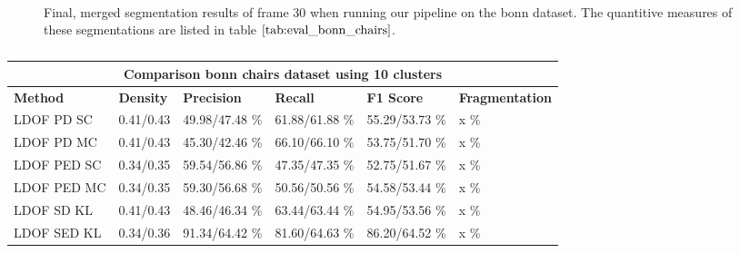\begin{figure}[H]
\begin{center}
~
~
\end{center}
\caption[Merged Segments Bonn Chairs]{Final, merged segmentation results of frame 30 when running our pipeline on the bonn dataset. The quantitive measures of these segmentations are listed in table $\ref{tab:eval_bonn_chairs}$.}
\label{fig:eval_bonn_chairs_c_10}
\end{figure}

\begin{table}[H]
\centering
\begin{tabular}{|l|l|l|l|l|l|}
\hline
\multicolumn{6}{|c|}{Comparison bonn chairs dataset using 10 clusters}                        \\ \hline
\textbf{Method} & \textbf{Density} & \textbf{Precision} & \textbf{Recall} & \textbf{F1 Score} & \textbf{Fragmentation} \\ \hline
LDOF PD SC & 0.41/0.43 & 49.98/47.48 \%   & 61.88/61.88 \%     & 55.29/53.73 \%  & x \% \\ \hline
LDOF PD MC & 0.41/0.43 & 45.30/42.46 \%   & 66.10/66.10 \%     & 53.75/51.70 \%  & x \%   \\ \hline
LDOF PED SC & 0.34/0.35& 59.54/56.86 \%   & 47.35/47.35 \%     & 52.75/51.67 \%  & x \%   \\ \hline
LDOF PED MC & 0.34/0.35 & 59.30/56.68 \%   & 50.56/50.56 \%     & 54.58/53.44 \%  & x \%   \\ \hline              
LDOF SD KL & 0.41/0.43 & 48.46/46.34 \%   & 63.44/63.44 \%     & 54.95/53.56 \%  & x \%   \\ \hline
LDOF SED KL & 0.34/0.36 & 91.34/64.42 \%   & 81.60/64.63 \%     & 86.20/64.52 \%    & x \%  \\ \hline
\end{tabular}
\caption[Bonn Chairs Merged 10 Clusters]{}
\label{tab:eval_bonn_chairs_c_10}
\end{table}






